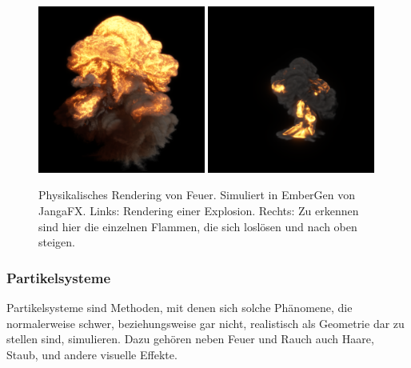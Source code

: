 \begin{figure}[h!]
	\includegraphics[width=0.49\textwidth]{Grafiken/Basics/Fire/explosion_0000.png}
	\includegraphics[width=0.49\textwidth]{Grafiken/Basics/Fire/explosion2_0000_0000.png}
	\centering
	\begin{footnotesize}
		\caption{Physikalisches Rendering von Feuer. Simuliert in EmberGen von JangaFX.  
			Links: Rendering einer Explosion. Rechts: Zu erkennen sind hier die einzelnen Flammen, die sich loslösen und nach oben steigen.}
		
		\label{fig:explosion}
	\end{footnotesize}
\end{figure}


\subsubsection{Partikelsysteme}
Partikelsysteme sind Methoden, mit denen sich solche Phänomene, die normalerweise schwer, beziehungsweise gar nicht, realistisch 
als Geometrie dar zu stellen sind, simulieren. Dazu gehören neben Feuer und Rauch auch Haare, Staub, und andere visuelle Effekte.


